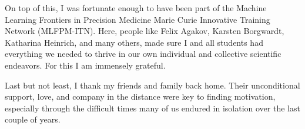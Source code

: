 On top of this, I was fortunate enough to have been part of the Machine Learning Frontiers in Precision Medicine Marie Curie Innovative Training Network (MLFPM-ITN). Here, people like Felix Agakov, Karsten Borgwardt, Katharina Heinrich, and many others, made sure I and all students had everything we needed to thrive in our own individual and collective scientific endeavors. For this I am immensely grateful.

Last but not least, I thank my friends and family back home. Their unconditional support, love, and company in the distance were key to finding motivation, especially through the difficult times many of us endured in isolation over the last couple of years.
